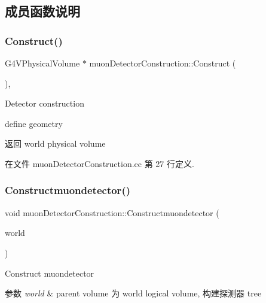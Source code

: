 \subsection{成员函数说明}
\mbox{\label{classmuonDetectorConstruction_ae06d0e4ad5f07bc1465a7faeccfdd19d}} 
\subsubsection{\texorpdfstring{Construct()}{Construct()}}
{\footnotesize\ttfamily G4\+V\+Physical\+Volume $\ast$ muon\+Detector\+Construction\+::\+Construct (\begin{DoxyParamCaption}{ }\end{DoxyParamCaption})\hspace{0.3cm}{\ttfamily [override]}, {\ttfamily [virtual]}}



Detector construction 

define geometry \begin{DoxyReturn}{返回}
world physical volume 
\end{DoxyReturn}


在文件 muon\+Detector\+Construction.\+cc 第 27 行定义.

\mbox{\label{classmuonDetectorConstruction_a69f2bf6d3288ca6a311ac07c2fbfc86d}} 
\subsubsection{\texorpdfstring{Constructmuondetector()}{Constructmuondetector()}}
{\footnotesize\ttfamily void muon\+Detector\+Construction\+::\+Constructmuondetector (\begin{DoxyParamCaption}\item[{G4\+Logical\+Volume $\ast$}]{world }\end{DoxyParamCaption})}



Construct muondetector 


\begin{DoxyParams}{参数}
{\em world} & parent volume 为 world logical volume, 构建探测器 tree \\
\hline
\end{DoxyParams}


